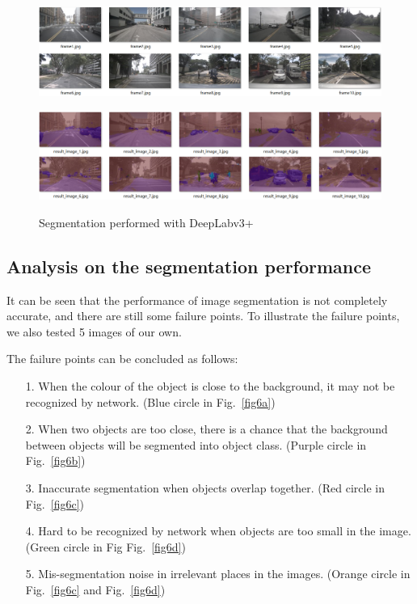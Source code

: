 \documentclass[10pt]{article}
\theoremstyle{nonumberplain}
\begin{document}
\begin{figure}[H]
	\centering
	\begin{minipage}[t]{1\textwidth}
		\centering
		\includegraphics[width=15cm]{211.png}
		\label{fig5a}
	\end{minipage}
	\begin{minipage}[t]{1\textwidth}
		\centering
		\includegraphics[width=15cm]{2.1_2.png}
		\label{fig5b}
	\end{minipage}
	\caption{Segmentation performed with DeepLabv3+}
	\label{fig5}
\end{figure} 


\subsection{Analysis on the segmentation performance}

\hspace{1.0em}
It can be seen that the performance of image segmentation is not completely accurate, and there are still some failure points. To illustrate the failure points, we also tested 5 images of our own.

The failure points can be concluded as follows:

\begin{itemize}
	\item[1.] When the colour of the object is close to the background, it may not be recognized by network. (Blue circle in Fig.~\ref{fig6a})
	\item[2.] When two objects are too close, there is a chance that the background between objects will be segmented into object class. (Purple circle in Fig.~\ref{fig6b})
	\item[3.] Inaccurate segmentation when objects overlap together. (Red circle in Fig.~\ref{fig6c})
	\item[4.] Hard to be recognized by network when objects are too small in the image. (Green circle in Fig Fig.~\ref{fig6d})
	\item[5.] Mis-segmentation noise in irrelevant places in the images. (Orange circle in Fig.~\ref{fig6c} and Fig.~\ref{fig6d})
\end{itemize}
\end{document}
